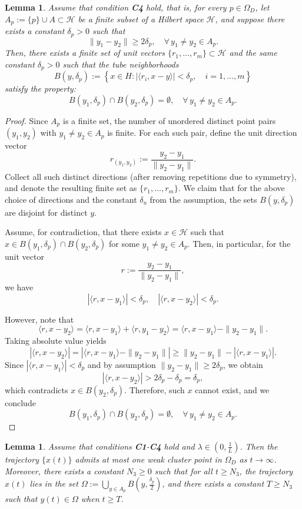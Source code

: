 \documentclass[hidelinks,11 pt]{article}
\numberwithin{equation}{section}
\newtheorem{lemma}[theorem]{Lemma}
\theoremstyle{definition}  %
\numberwithin{equation}{section}
\numberwithin{theorem}{section}
\begin{document}
\begin{lemma}\label{l3.7}
Assume that condition \textbf{C4} hold, that is, for every \( p \in \Omega_D \), let $A_p := \{p\} \cup A \subset \mathcal{H}$ be a finite subset of a Hilbert space $\mathcal{H}$, and suppose there exists a constant $\delta_p > 0$ such that
\[
\|y_1 - y_2\| \geq 2\delta_p, \quad \forall\, y_1 \neq y_2 \in A_p.
\]
Then, there exists a finite set of unit vectors $\{r_1, \dots, r_m\} \subset \mathcal{H}$ and the same constant $\delta_p > 0$ such that the tube neighborhoods
\[
B(y, \delta_p) := \left\{ x \in H : |\langle r_i, x - y \rangle| < \delta_p, \quad i = 1, \dots, m \right\}
\]
satisfy the property:
\[
B(y_1, \delta_p) \cap B(y_2, \delta_p) = \emptyset, \quad \forall\, y_1 \neq y_2 \in A_p.
\]
\end{lemma}

\begin{proof}
Since $A_p$ is a finite set, the number of unordered distinct point pairs $(y_1, y_2)$ with $y_1 \neq y_2 \in A_p$ is finite. For each such pair, define the unit direction vector
\[
r_{(y_1,y_2)} := \frac{y_2 - y_1}{\|y_2 - y_1\|}.
\]
Collect all such distinct directions (after removing repetitions due to symmetry), and denote the resulting finite set as $\{r_1, \dots, r_m\}$.
We claim that for the above choice of directions and the constant $\delta_u$ from the assumption, the sets $B(y, \delta_p)$ are disjoint for distinct $y$.

Assume, for contradiction, that there exists $x \in \mathcal{H}$ such that $x \in B(y_1, \delta_p) \cap B(y_2, \delta_p)$ for some $y_1 \neq y_2 \in A_p$. Then, in particular, for the unit vector
\[
r := \frac{y_2 - y_1}{\|y_2 - y_1\|},
\]
we have
\[
|\langle r, x - y_1 \rangle| < \delta_p, \quad |\langle r, x - y_2 \rangle| < \delta_p.
\]

However, note that
\[
\langle r, x - y_2 \rangle = \langle r, x - y_1 \rangle + \langle r, y_1 - y_2 \rangle = \langle r, x - y_1 \rangle - \|y_2 - y_1\|.
\]
Taking absolute value yields
\[
|\langle r, x - y_2 \rangle| = \left| \langle r, x - y_1 \rangle - \|y_2 - y_1\| \right| \geq \|y_2 - y_1\| - |\langle r, x - y_1 \rangle|.
\]
Since $|\langle r, x - y_1 \rangle| < \delta_p$ and by assumption $\|y_2 - y_1\| \geq 2\delta_p$, we obtain
\[
|\langle r, x - y_2 \rangle| > 2\delta_p - \delta_p = \delta_p,
\]
which contradicts $x \in B(y_2, \delta_p)$. Therefore, such $x$ cannot exist, and we conclude
\[
B(y_1, \delta_p) \cap B(y_2, \delta_p) = \emptyset, \quad \forall\, y_1 \neq y_2 \in A_p.
\]
\end{proof}
\begin{lemma}
Assume that conditions \textbf{C1}-\textbf{C4} hold and $\lambda\in(0,\frac{1}{L})$. Then the trajectory \(\{x(t)\}\) admits at most one weak cluster point in \(\Omega_D\) as \(t \to \infty\). Moreover, there exists a constant \(N_3 \geq 0\) such that for all \(t \geq N_3\), the trajectory $x(t)$ lies in the set \(\Omega := \bigcup_{y \in A_p} B\left(y, \frac{\delta_p}{2}\right)\), and there exists a constant \(T \geq N_3\) such that $y(t)\in\Omega$ when \(t \geq T\).
\end{lemma}
\end{document}
